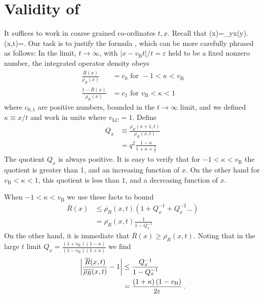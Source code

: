 \documentclass[aps,prb,twocolumn,superscriptaddress]{revtex4-1}
\begin{document}
\section{Validity of  }\label{app:approx}
It suffices to work in coarse grained co-ordinates $t,x$. Recall that
\be
{}(x)=\sum_{y\leq x}(y).
\ee
\be
{}(x,t)=.
\ee
Our task is to justify the formula  , which can be more carefully phrased as follows:
In the limit, $t\rightarrow\infty$, with $\ensuremath{|x-v_{\text{B}}t|/t=\varepsilon}$
held to be a fixed nonzero number, the integrated operator density
obeys
\begin{align}\label{eq:precisebounds}
\frac{\overline{R}(x)}{\overline{\rho_{R}}(x)} & =c_{0}\text{ for }-1<\kappa<v_{\text{B}} \\
\frac{1-\overline{R}(x)}{\overline{\rho_{R}}(x)} & =c_{1}\text{ for }v_{\text{B}}<\kappa<1
\end{align}
where $c_{0,1}$ are  positive numbers, bounded  in the $t\rightarrow\infty $ limit, and we defined $\kappa\equiv x/ t$ and work in units where $v_{\text{LC}} =1$. Define
\begin{align}
Q_{x} & \equiv\frac{\overline{\rho_{R}}(x+1,t)}{\overline{\rho_{R}}(x,t)}\\
 & =q^{2}\frac{1-\kappa}{1+\kappa+\frac{1}{t}}
\end{align}
The quotient $Q_{x}$ is always positive. It is easy to verify that for $-1<\kappa <v_{\text{B}} $
the quotient is greater than 1, and an increasing function of $x$. On the other hand for $v_{\text{B}}<\kappa<1$, this quotient is less than $1$, and a decreasing function
of $x$.

When $-1<\kappa<v_{\text{B}}$ we use
these facts to bound
\begin{align}
\overline{R}(x) & \leq\overline{\rho_{R}}(x,t)(1+Q_{x}^{-1}+Q_{x}^{-2}\ldots)\nonumber\\
 & =\overline{\rho_{R}}(x,t)\frac{1}{1-Q_{x}^{-1}}
\end{align}
On the other hand, it is immediate that $\overline{R}(x)\geq\overline{\rho_{R}}(x,t)$.
Noting that in the large $t$ limit $Q_{x}=\frac{(1+v_{\text{B}})(1-\kappa)}{(1-v_{\text{B}})(1+\kappa)}$
we find
\begin{align}\label{bound1}
\left|\frac{\overline{R}(x,t)}{\overline{\rho_{R}}(x,t)}-1\right| & \leq\frac{Q_{x}^{-1}}{1-Q_{x}^{-1}}\nonumber\\
 & =\frac{\left(1+\kappa\right)\left(1-v_{\text{B}}\right)}{2\varepsilon}\,.
\end{align}
\end{document}
